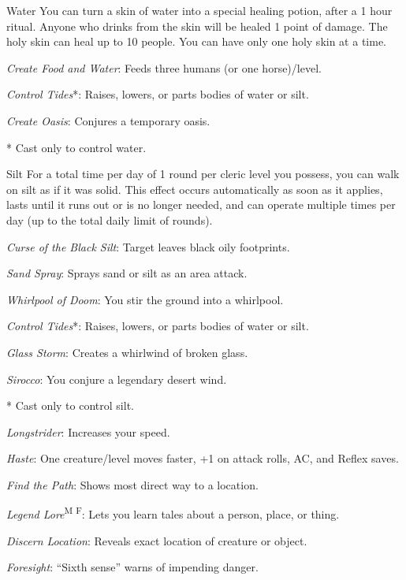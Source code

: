 {Water}
{You can turn a skin of water into a special healing potion, after a 1 hour ritual. Anyone who drinks from the skin will be healed 1 point of damage. The holy skin can heal up to 10 people. You can have only one holy skin at a time.}
{
	\item 
	\item 
	\item \textit{Create Food and Water}: Feeds three humans (or one horse)/level.
	\item \textit{Control Tides}*: Raises, lowers, or parts bodies of water or silt.
	\item
	\item
	\item \textit{Create Oasis}: Conjures a temporary oasis.
	\item 
	\item 
}
* Cast only to control water.

{Silt}
{For a total time per day of 1 round per cleric level you possess, you can walk on silt as if it was solid. This effect occurs automatically as soon as it applies, lasts until it runs out or is no longer needed, and can operate multiple times per day (up to the total daily limit of rounds).}
{
	\item 
	\item \textit{Curse of the Black Silt}: Target leaves black oily footprints.
	\item \textit{Sand Spray}: Sprays sand or silt as an area attack.
	\item \textit{Whirlpool of Doom}: You stir the ground into a whirlpool.
	\item \textit{Control Tides}*: Raises, lowers, or parts bodies of water or silt.
	\item
	\item \textit{Glass Storm}: Creates a whirlwind of broken glass.
	\item \textit{Sirocco}: You conjure a legendary desert wind.
	\item 
}
* Cast only to control silt.

{}
{}
{
	\item \textit{Longstrider}: Increases your speed.
	\item 
	\item 
	\item \textit{Haste}: One creature/level moves faster, +1 on attack rolls, AC, and Reflex saves.
	\item 
	\item \textit{Find the Path}: Shows most direct way to a location.
	\item \textit{Legend Lore}\textsuperscript{M F}: Lets you learn tales about a person, place, or thing.
	\item \textit{Discern Location}: Reveals exact location of creature or object.
	\item \textit{Foresight}: ``Sixth sense'' warns of impending danger.
}

